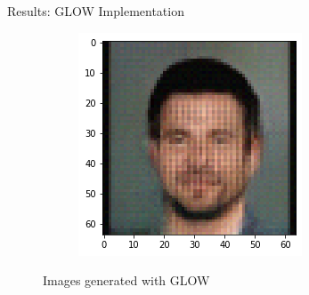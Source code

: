 \begin{frame}{Results: GLOW Implementation}
\begin{figure}[htbp!]
\begin{subfigure}[b]{0.3\textwidth}
     \end{subfigure}
     \hfill
     \begin{subfigure}[b]{0.3\textwidth}
         \centering
         \includegraphics[width=\textwidth]{Images/celeb_sample3.png}
     \end{subfigure}
     \hfill
     \caption{Images generated with GLOW}
\end{figure}
\end{frame}

